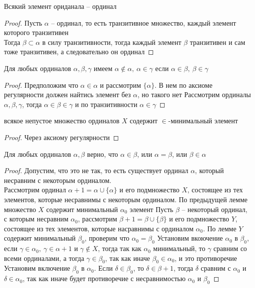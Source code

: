 \begin{lem}
Всякий элемент ориданала -- ординал
\end{lem}

\begin{proof}
Пусть $\alpha$ -- ординал, то есть транзитивное множество, каждый элемент которого транзитивен\\
Тогда $\beta \subset \alpha$ в силу транзитивности, тогда каждый элемент $\beta$ транзитивен и сам тоже транзитивен, а следовательно он ординал
\end{proof}

\begin{lem}
Для любых ординалов $\alpha, \beta, \gamma$ имеем $\alpha \notin \alpha,\ \alpha \in \gamma$ если $\alpha \in \beta,\ \beta \in \gamma$
\end{lem}
\begin{proof}
Предположим что $\alpha \in \alpha$ и рассмотрим $\{\alpha\}$. В нем по аксиоме регулярности должен найтись элемент без $\alpha$, но такого нет
\vskip 0.1in
Рассмотрим ординалы $\alpha, \beta, \gamma$, тогда $\alpha \in \beta \in \gamma$ и по транзитивности $\alpha \in \gamma$
\end{proof}

\begin{lem}
всякое непустое множество ординалов $X$ содержит $\in$-минимальный элемент
\end{lem}
\begin{proof}
Через аксиому регулярности
\end{proof}

\begin{lem}
Для любых ординалов $\alpha, \beta$ верно, что $\alpha \in \beta$, или $\alpha = \beta$, или $\beta \in \alpha$
\end{lem}
\begin{proof}
Допустим, что это не так, то есть существует ординал $\alpha$, который несравним с некоторым ординалом.\\
Рассмотрим ординал $\alpha + 1 = \alpha \cup \{\alpha\}$ и его подмножество $X$, состоящее из тех элементов, которые несравнимы с некоторым ординалом. По предыдущей лемме множество $X$ содержит минимальный $\alpha_0$ элемент
\vskip 0.1in
Пусть $\beta$ -- некоторый ординал, с которым несравним $\alpha_0$, рассмотрим $\beta + 1 = \beta \cup \{\beta\}$ и его подмножество $Y$, состоящее из тех элементов, которые насравнимы с ординалом $\alpha_0$. По лемме $Y$ содержит минимальный $\beta_0$, проверим что $\alpha_0 = \beta_0$
\vskip 0.1in
Установим вкоючение $\alpha_0$ в $\beta_0$, если $\gamma \in \alpha_0,\ \gamma \in \alpha + 1$ и $\gamma \notin X$, тогда так как $\alpha_0$ минимальный, то $\gamma$ сравним со всеми ординалами, а тогда $\gamma \in \beta_0$, так как иначе $\beta_0 \in \alpha_0$, и это противоречие
\vskip 0.1in
Установим включение $\beta_0$ в $\alpha_0$. Если $\delta \in \beta_0$, то $\delta \in \beta + 1$, тогда $\delta$ сравним с $\alpha_0$ и $\delta \in \alpha_0$, так как иначе будет противоречие с несравнимостью $\alpha_0$ и $\beta_0$
\end{proof}

